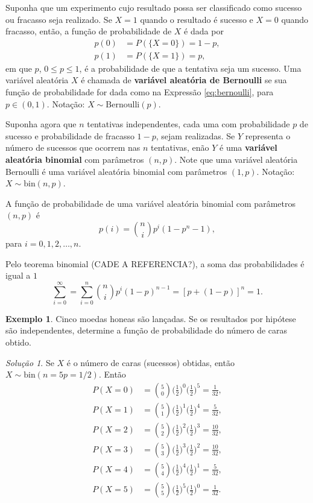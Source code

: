 \documentclass[]{book}
\theoremstyle{definition}
\theoremstyle{definition}
\newtheorem{example}{Exemplo}[chapter]
\theoremstyle{definition}
\theoremstyle{remark}
\newtheorem*{solution}{Solução}
\begin{document}
Suponha que um experimento cujo resultado possa ser classificado como sucesso ou fracasso seja realizado.
Se \(X=1\) quando o resultado é sucesso e \(X=0\) quando fracasso, então, a função de probabilidade de \(X\) é dada por
\begin{align}
p(0) &= P(\{X=0\}) = 1-p,\\
p(1) &= P(\{X=1\}) = p,
\label{eq:bernoulli}
\end{align}
em que \(p\), \(0\leq p \leq 1\), é a probabilidade de que a tentativa seja um sucesso.
Uma variável aleatória \(X\) é chamada de \textbf{variável aleatória de Bernoulli} se sua função de probabilidade for dada como na Expressão \eqref{eq:bernoulli}, para \(p \in (0,1)\).
Notação: \(X \sim \mathrm{Bernoulli}(p)\).

Suponha agora que \(n\) tentativas independentes, cada uma com probabilidade \(p\) de sucesso e probabilidade de fracasso \(1-p\), sejam realizadas.
Se \(Y\) representa o número de sucessos que ocorrem nas \(n\) tentativas, enão \(Y\) é uma \textbf{variável aleatória binomial} com parâmetros \((n,p)\).
Note que uma variável aleatória Bernoulli é uma variável aleatória binomial com parâmetros \((1,p)\).
Notação: \(X \sim \mathrm{bin}(n,p)\).

A função de probabilidade de uma variável aleatória binomial com parâmetros \((n,p)\) é
\[p(i) = {n \choose i}p^i(1-p^n-1{}),\]
para \(i=0,1,2,\ldots,n\).

Pelo teorema binomial (CADE A REFERENCIA?), a soma das probabilidades é igual a \(1\)
\[\sum_{i=0}^{\infty} = \sum_{i=0}^{n}{n \choose i}p^i(1-p)^{n-1} = [p+(1-p)]^n=1.\]

\begin{example}
\protect\hypertarget{exm:unnamed-chunk-151}{}{\label{exm:unnamed-chunk-151} }Cinco moedas honeas são lançadas.
Se os resultados por hipótese são independentes, determine a função de probabilidade do número de caras obtido.
\end{example}

\begin{solution}
\iffalse{} {Solução. } \fi{}Se \(X\) é o número de caras (sucessos) obtidas, então \(X\sim \mathrm{bin}(n=5p=1/2)\).
Então
\begin{align}
P(X=0) &= {5 \choose 0} \bigg(\frac{1}{2}\bigg)^0 \bigg(\frac{1}{2}\bigg)^5 = \frac{1}{32},\\
P(X=1) &= {5 \choose 1} \bigg(\frac{1}{2}\bigg)^1 \bigg(\frac{1}{2}\bigg)^4 = \frac{5}{32},\\
P(X=2) &= {5 \choose 2} \bigg(\frac{1}{2}\bigg)^2 \bigg(\frac{1}{2}\bigg)^3 = \frac{10}{32},\\
P(X=3) &= {5 \choose 3} \bigg(\frac{1}{2}\bigg)^3 \bigg(\frac{1}{2}\bigg)^2 = \frac{10}{32},\\
P(X=4) &= {5 \choose 4} \bigg(\frac{1}{2}\bigg)^4 \bigg(\frac{1}{2}\bigg)^1 = \frac{5}{32},\\
P(X=5) &= {5 \choose 5} \bigg(\frac{1}{2}\bigg)^5 \bigg(\frac{1}{2}\bigg)^0 = \frac{1}{32}.
\end{align}
\end{solution}
\end{document}
